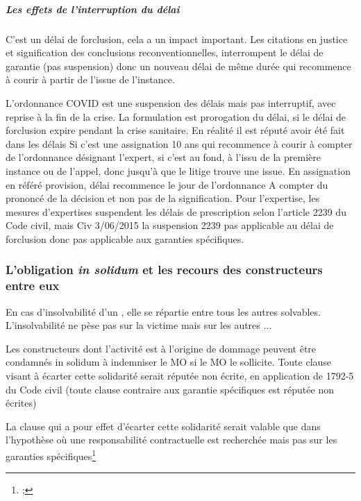 				\subparagraph{Les effets de l'interruption du délai}

				C’est un délai de forclusion, cela a un impact important. Les citations en justice et signification des conclusions reconventionnelles, interrompent le délai de garantie (pas suspension) donc un nouveau délai de même durée qui recommence à courir à partir de l’issue de l’instance.

				L’ordonnance COVID est une suspension des délais mais pas interruptif, avec reprise à la fin de la crise. La formulation est prorogation du délai, si le délai de forclusion expire pendant la crise sanitaire. En réalité il est réputé avoir été fait dans les délais
				Si c’est une assignation 10 ans qui recommence à courir à compter de l’ordonnance désignant l’expert, si c’est au fond, à l’issu de la première instance ou de l’appel, donc jusqu’à que le litige trouve une issue.
				En assignation en référé provision, délai recommence le jour de l’ordonnance
				A compter du prononcé de la décision et non pas de la signification.
				Pour l’expertise, les mesures d’expertises suspendent les délais de prescription selon l’article 2239 du Code civil, mais Civ 3/06/2015 la suspension 2239 pas applicable au délai de forclusion donc pas applicable aux garanties spécifiques.


		\subsubsection{L'obligation \emph{in solidum} et les recours des constructeurs entre eux}

			En cas d'insolvabilité d'un \lo, elle se répartie entre tous les autres \lo solvables. L'insolvabilité ne pèse pas sur la victime mais sur les autres ...

			Les constructeurs dont l’activité est à l’origine de dommage peuvent être condamnés in solidum à indemniser le MO si le MO le sollicite. Toute clause visant à écarter cette solidarité serait réputée non écrite, en application de 1792-5 du Code civil (toute clause contraire aux garantie spécifiques est réputée non écrites)

			La clause qui a pour effet d’écarter cette solidarité serait valable que dans l’hypothèse où une responsabilité contractuelle est recherchée mais pas sur les garanties spécifiques\footnote{ ; }

